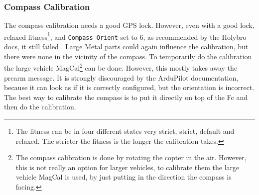 \documentclass[svgnames]{article}
\begin{document}
	\subsubsection{Compass Calibration}
	The compass calibration needs a good \gls{GPS} lock. However, even with a good lock, relaxed fitness\footnote{The fitness can be in four different states very strict, strict, default and relaxed. The stricter the fitness is the longer the calibration takes.}, and \lstinline|Compass_Orient| set to 6, as recommended by the Holybro docs, it still failed \cite{HolybroDocs}. Large Metal parts could again influence the calibration, but there were none in the vicinity of the compass. To temporarily do the calibration the large vehicle MagCal\footnote{The compass calibration is done by rotating the copter in the air. However, this is not really an option for larger vehicles, to calibrate them the large vehicle MagCal is used, by just putting in the direction the compass is facing.} can be done. However, this mostly takes away the prearm message. It is strongly discouraged by the ArduPilot documentation, because it can look as if it is correctly configured, but the orientation is incorrect. The best way to calibrate the compass is to put it directly on  top of the \gls{Fc} and then do the calibration.
\end{document}
